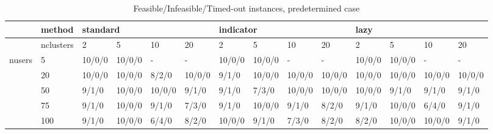 \begin{table}[]
\centering
\begin{small}
\setlength{\tabcolsep}{1.5pt}
\begin{tabular}{|l|l|l|l|l|l|l|l|l|l|l|l|l|l|}
\hline
& method & \multicolumn{4}{l|}{standard} & \multicolumn{4}{l|}{indicator} & \multicolumn{4}{l|}{lazy} \\
\hline
& nclusters & 2 & 5 & 10 & 20 & 2 & 5 & 10 & 20 & 2 & 5 & 10 & 20 \\
\hline
\multirow{5}{*}{nusers} & 5 & 10/0/0 & 10/0/0 &  -  &  -  & 10/0/0 & 10/0/0 &  -  &  -  & 10/0/0 & 10/0/0 &  -  &  -  \\
& 20 & 10/0/0 & 10/0/0 & 8/2/0 & 10/0/0 & 9/1/0 & 10/0/0 & 10/0/0 & 10/0/0 & 10/0/0 & 10/0/0 & 10/0/0 & 10/0/0 \\
& 50 & 9/1/0 & 10/0/0 & 10/0/0 & 9/1/0 & 9/1/0 & 7/3/0 & 10/0/0 & 10/0/0 & 10/0/0 & 9/1/0 & 9/1/0 & 9/1/0 \\
& 75 & 9/1/0 & 10/0/0 & 9/1/0 & 7/3/0 & 9/1/0 & 10/0/0 & 9/1/0 & 8/2/0 & 9/1/0 & 10/0/0 & 6/4/0 & 9/1/0 \\
& 100 & 9/1/0 & 10/0/0 & 6/4/0 & 8/2/0 & 10/0/0 & 9/1/0 & 7/3/0 & 8/2/0 & 8/2/0 & 10/0/0 & 10/0/0 & 9/1/0 \\
\hline
\end{tabular}
\end{small}
\caption{Feasible/Infeasible/Timed-out instances, predetermined case}
\label{tab:statspredetermined}
\end{table}
